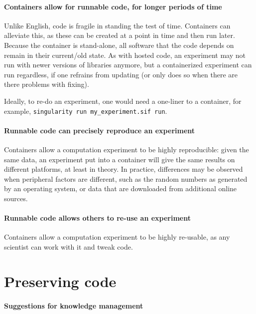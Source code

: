 \paragraph{Containers allow for runnable code, for longer periods of time}

Unlike English, code is fragile in standing the test of time.
Containers can alleviate this, as these can be created at a point
in time and then run later. Because the container is stand-alone,
all software that the code depends on remain in their current/old state.
As with hosted code, an experiment may not run with newer versions
of libraries anymore, but a containerized experiment can run regardless, 
if one refrains from updating (or only does so when there are there problems with fixing).

Ideally, to re-do an experiment, one would need a one-liner to a container,
for example, \verb|singularity run my_experiment.sif run|.

\paragraph{Runnable code can precisely reproduce an experiment}

Containers allow a computation experiment to be highly reproducible:
given the same data, an experiment put into a container will give
the same results on different platforms, at least in theory.
In practice, differences may be observed when peripheral factors
are different, such as the random numbers as generated by an operating
system, or data that are downloaded from additional online sources.

\paragraph{Runnable code allows others to re-use an experiment}

Containers allow a computation experiment to be highly re-usable,
as any scientist can work with it and tweak code.

\section{Preserving code}

\paragraph{Suggestions for knowledge management}

